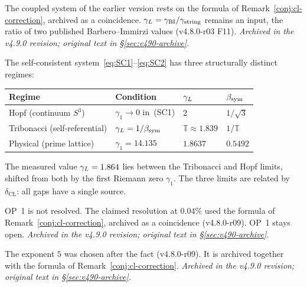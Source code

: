 \begin{theorem}\label{thm:self-consistent-gL}
The coupled system of the earlier version rests on the formula of Remark~\ref{conj:cl-correction}, archived as a coincidence.  \(\gamma_L=\gamma_{\mathrm{BI}}/\gamma_{\mathrm{string}}\) remains an input, the ratio of two published Barbero--Immirzi values (v4.8.0-r03 F11).
\emph{Archived in the v4.9.0 revision; original text in \S\ref{sec:v490-archive}.}
\end{theorem}

\begin{remark}
\label{rem:three-limits}
The self-consistent system~\eqref{eq:SC1}--\eqref{eq:SC2} has three
structurally distinct regimes:
\begin{center}
\renewcommand{\arraystretch}{1.4}
\begin{tabular}{llll}
\toprule
Regime & Condition & $\gamma_L$ & $\beta_{\mathrm{sym}}$ \\
\midrule
Hopf (continuum $S^3$)  & $\gamma_1\to 0$ in~(SC1)  & $2$  & $1/\sqrt{3}$ \\
Tribonacci (self-referential) & $\gamma_L = 1/\beta_{\mathrm{sym}}$ & $\mathbb{T}\approx 1.839$ & $1/\mathbb{T}$ \\
Physical (prime lattice) & $\gamma_1 = 14.135$ & $1.8637$ & $0.5492$ \\
\bottomrule
\end{tabular}
\end{center}
The measured value $\gamma_L = 1.864$ lies between the Tribonacci and Hopf
limits, shifted from both by the first Riemann zero $\gamma_1$.
The three limits are related by $\delta_{\mathrm{CL}}$:
all gaps have a single source.
\end{remark}

\begin{corollary}\label{cor:op1-resolved}
OP~1 is not resolved.  The claimed resolution at \(0.04\%\) used the formula of Remark~\ref{conj:cl-correction}, archived as a coincidence (v4.8.0-r09).  OP~1 stays open.
\emph{Archived in the v4.9.0 revision; original text in \S\ref{sec:v490-archive}.}
\end{corollary}

\begin{proposition}\label{prop:exponent-5}
The exponent \(5\) was chosen after the fact (v4.8.0-r09).  It is archived together with the formula of Remark~\ref{conj:cl-correction}.
\emph{Archived in the v4.9.0 revision; original text in \S\ref{sec:v490-archive}.}
\end{proposition}

